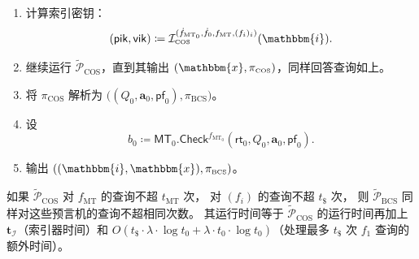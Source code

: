 \documentclass[american,singlepageview]{snargs-book-zh}
\newcommand{\Malicious}[1]{\tilde{#1}}
\newcommand{\DefineEqual}{\coloneqq}
\renewcommand{\vec}[1]{\bm{#1}}
\newcommand{\DecisionBit}{b}
\newcommand{\Index}{\mathbbm{i}}
\newcommand{\Instance}{\mathbbm{x}}
\newcommand{\ProtoIndexer}{I}
\newcommand{\ProtoProver}{P}
\newcommand{\RoundIndex}{i}
\newcommand{\IOPEntry}{a}
\newcommand{\IOPEntries}{\vec{\IOPEntry}}
\newcommand{\IOPQuerySet}{Q}
\newcommand{\ARGFormat}[1]{\mathcal{#1}}
\newcommand{\ARGIndexer}{\ARGFormat{\ProtoIndexer}}
\newcommand{\ARGProver}{\ARGFormat{\ProtoProver}}
\newcommand{\ARGString}{\pi}
\newcommand{\ARGpik}{\mathsf{pik}}
\newcommand{\ARGvik}{\mathsf{vik}}
\newcommand{\IndexRoundSubscript}{0}
\newcommand{\ARGComplexityFormat}[1]{\mathbf{#1}}
\newcommand{\ARGTimeI}{\ARGComplexityFormat{t}_{\scriptscriptstyle\ARGIndexer}}
\newcommand{\ROFunction}{f}
\newcommand{\ROQueryBound}{t}
\newcommand{\SecurityParameter}{\lambda}
\newcommand{\ROQuery}{x}
\newcommand{\Lazy}[1]{\dot{#1}}
\newcommand{\LazySub}[2]{\Lazy{#1}_{#2}}
\newcommand{\ROFunctionAlt}{g}
\newcommand{\ROTreeSymbol}{\MTSubscript}
\newcommand{\RORandSymbol}{\scriptscriptstyle \mathsf{\$}}
\newcommand{\ROTreeFunction}{\ROFunction_{\ROTreeSymbol}}
\newcommand{\RORandRoundFunction}[1]{\ROFunction_{#1}}
\newcommand{\ROTreeQueryBound}{\ROQueryBound_{\ROTreeSymbol}}
\newcommand{\RORandQueryBound}{\ROQueryBound_{\RORandSymbol}}
\newcommand{\MTSymbol}{\mathsf{MT}}
\newcommand{\MTSubscript}{{\scriptscriptstyle\mathrm{MT}}}
\newcommand{\MTCommitment}{\mathsf{rt}}
\newcommand{\MTProof}{\mathsf{pf}}
\newcommand{\MTIdxCheck}[1]{\MTSymbol_{#1}.\mathsf{Check}}
\newcommand{\BCSSubscript}{\scriptscriptstyle\mathrm{BCS}}
\newcommand{\COSSubscript}{\scriptscriptstyle\mathrm{COS}}
\newcommand{\COSIndexer}{\ARGIndexer_{\COSSubscript}}
\newcommand{\ExtraTimeofCOSToBCSProver}{O(\RORandQueryBound \cdot \SecurityParameter \cdot \log \ROIndexHashQueryBound + \SecurityParameter \cdot \ROIndexHashQueryBound \cdot \log \ROIndexHashQueryBound)}
\newcommand{\ROIndexHashQueryBound}{\ROQueryBound_{\IndexRoundSubscript}}
\newcommand{\ROIndexTreeFunction}{\ROFunction_{\ROTreeSymbol_{\IndexRoundSubscript}}}
\newcommand{\LazyROIndexHashFunction}{\Lazy{\ROFunction}_{\IndexRoundSubscript}}
\newcommand{\LazyROIndexTreeFunction}{\Lazy{\ROFunction}_{\ROTreeSymbol_{\IndexRoundSubscript}}}
\begin{document}
\begin{construction}
\begin{itemize}[noitemsep]
\begin{enumerate}[nolistsep]
\begin{itemize}[noitemsep]
\begin{enumerate}[noitemsep]
                作答；
          \item 否则（无或不唯一），以 $\LazySub{\ROFunctionAlt}{1}(\ROQuery)$ 作答。
        \end{enumerate}
    \end{itemize}
  \item 计算索引密钥：
    \[
      (\ARGpik,\ARGvik)
      \DefineEqual \COSIndexer^{(\LazyROIndexTreeFunction,\LazyROIndexHashFunction,\ROTreeFunction,(\RORandRoundFunction{\RoundIndex})_{\RoundIndex})}(\Index).
    \]
  \item 继续运行 $\Malicious{\ARGProver}_{\COSSubscript}$，直到其输出
    $(\Instance,\ARGString_{\COSSubscript})$，同样回答查询如上。
  \item 将 $\ARGString_{\COSSubscript}$ 解析为
    $\bigl((\IOPQuerySet_{0},\IOPEntries_{0},\MTProof_{0}),\ARGString_{\BCSSubscript}\bigr)$。
  \item 设
    \[
      \DecisionBit_{0}
      \DefineEqual
      \MTIdxCheck{0}^{\ROIndexTreeFunction}
        (\MTCommitment_{0},\IOPQuerySet_{0},\IOPEntries_{0},\MTProof_{0}).
    \]
  \item 输出 $((\Index,\Instance),\ARGString_{\BCSSubscript})$。
\end{enumerate}
\end{itemize}

如果 $\Malicious{\ARGProver}_{\COSSubscript}$ 对
$\ROTreeFunction$ 的查询不超 $\ROTreeQueryBound$ 次，
对 $(\RORandRoundFunction{\RoundIndex})$ 的查询不超 $\RORandQueryBound$ 次，
则 $\Malicious{\ARGProver}_{\BCSSubscript}$ 同样对这些预言机的查询不超相同次数。
其运行时间等于 $\Malicious{\ARGProver}_{\COSSubscript}$ 的运行时间再加上
$\ARGTimeI$（索引器时间）和
$\ExtraTimeofCOSToBCSProver$（处理最多 $\RORandQueryBound$ 次 $\RORandRoundFunction{1}$ 查询的额外时间）。
\end{construction}
\end{document}

